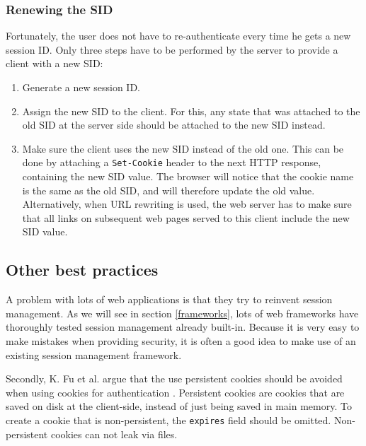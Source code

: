 \subsubsection{Renewing the SID}
Fortunately, the user does not have to re-authenticate every time he gets a new session ID. Only three steps have to be performed by the server to provide a client with a new SID:
\begin{enumerate}
	\item Generate a new session ID.
	\item Assign the new SID to the client. For this, any state that was attached to the old SID at the server side should be attached to the new SID instead.
	\item Make sure the client uses the new SID instead of the old one. This can be done by attaching a \texttt{Set-Cookie} header to the next HTTP response, containing the new SID value. The browser will notice that the cookie name is the same as the old SID, and will therefore update the old value. Alternatively, when URL rewriting is used, the web server has to make sure that all links on subsequent web pages served to this client include the new SID value.
\end{enumerate}

\subsection{Other best practices}

A problem with lots of web applications is that they try to reinvent session management. As we will see in section \ref{frameworks}, lots of web frameworks have thoroughly tested session management already built-in. Because it is very easy to make mistakes when providing security, it is often a good idea to make use of an existing session management framework.

Secondly, K. Fu et al. argue that the use persistent cookies should be avoided when using cookies for authentication \cite{Fu2001}. Persistent cookies are cookies that are saved on disk at the client-side, instead of just being saved in main memory. To create a cookie that is non-persistent, the \texttt{expires} field should be omitted. Non-persistent cookies can not leak via files.
